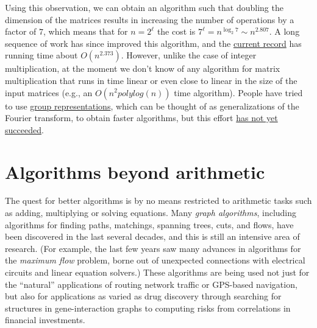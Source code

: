 \begin{remark}
Using this observation, we can obtain an algorithm such that doubling
the dimension of the matrices results in increasing the number of
operations by a factor of \(7\), which means that for \(n=2^\ell\) the
cost is \(7^\ell = n^{\log_2 7} \sim n^{2.807}\). A long sequence of
work has since improved this algorithm, and the
\href{https://en.wikipedia.org/wiki/Matrix_multiplication_algorithm\#Sub-cubic_algorithms}{current
record} has running time about \(O(n^{2.373})\). However, unlike the
case of integer multiplication, at the moment we don't know of any
algorithm for matrix multiplication that runs in time linear or even
close to linear in the size of the input matrices (e.g., an
\(O(n^2 polylog(n))\) time algorithm). People have tried to use
\href{https://en.wikipedia.org/wiki/Group_representation}{group
representations}, which can be thought of as generalizations of the
Fourier transform, to obtain faster algorithms, but this effort
\href{http://discreteanalysisjournal.com/article/1245-on-cap-sets-and-the-group-theoretic-approach-to-matrix-multiplication}{has
not yet succeeded}.

\end{remark}

\section{Algorithms beyond arithmetic}\label{algsbeyondarithmetic}

The quest for better algorithms is by no means restricted to arithmetic
tasks such as adding, multiplying or solving equations. Many \emph{graph
algorithms}, including algorithms for finding paths, matchings, spanning
trees, cuts, and flows, have been discovered in the last several
decades, and this is still an intensive area of research. (For example,
the last few years saw many advances in algorithms for the \emph{maximum
flow} problem, borne out of unexpected connections with electrical
circuits and linear equation solvers.) These algorithms are being used
not just for the ``natural'' applications of routing network traffic or
GPS-based navigation, but also for applications as varied as drug
discovery through searching for structures in gene-interaction graphs to
computing risks from correlations in financial investments.

